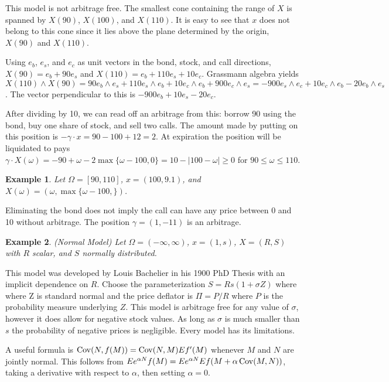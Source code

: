 \documentclass[fleqn]{amsart}
\newcommand{\Cov}{\mathop{\rm{Cov}}}
\newtheorem{example}{Example}
\begin{document}
This model is not arbitrage free.  The smallest cone containing the
range of $X$ is spanned by $X(90)$, $X(100)$, and $X(110)$. It is easy
to see that $x$ does not belong to this cone since it lies above the
plane determined by the origin, $X(90)$ and $X(110)$.

Using $e_b$, $e_s$, and $e_c$ as unit vectors in the bond, stock, and call
directions, $X(90) = e_b + 90e_s$ and $X(110) = e_b + 110e_s + 10e_c$.
Grassmann algebra\cite{Pea1999} yields $X(110)\wedge X(90)
= 90 e_b\wedge e_s + 110e_s\wedge e_b + 10e_c\wedge e_b + 900e_c\wedge e_s
= -900e_s\wedge e_c + 10e_c\wedge e_b - 20e_b\wedge e_s$. The vector
perpendicular to this is $-900e_b + 10e_s - 20e_c$.

After dividing by 10, we can read off an arbitrage from this: borrow 90
using the bond, buy one share of stock, and sell two calls. The amount
made by putting on this position is $-\gamma\cdot x = 90 - 100 + 12 = 2$. At
expiration the position will be liquidated to pays $\gamma\cdot X(\omega)
= -90 + \omega - 2\max\{\omega - 100, 0\} = 10 - |100 - \omega| \ge 0$
for $90\le\omega\le 110$.

\begin{example}
Let $\Omega = [90,110]$, $x = (100, 9.1)$, 
and $X(\omega) = (\omega, \max\{\omega - 100, \})$.
\end{example}

Eliminating the bond does not imply the call can have any price
between 0 and 10 without arbitrage. The position
$\gamma = (1, -11)$ is an arbitrage.

\begin{example}{(Normal Model)}
Let \(\Omega = (-\infty,\infty)\), \(x = (1, s)\), 
\(X = (R, S)\) with \(R\) scalar, and \(S\) normally distributed.
\end{example}
This model was developed by Louis Bachelier in his
1900 PhD Thesis\cite{Bac1900} with an implicit dependence on \(R\). 
Choose the parameterization \(S = Rs(1 + \sigma Z)\) where
where Z is standard normal and the price deflator is \(\Pi = P/R\)
where \(P\) is the probability measure underlying
\(Z\). This model is arbitrage free for any value of \(\sigma\),
however it does allow for negative stock values. As long as
\(\sigma\) is much smaller than \(s\) the probability of
negative prices is negligible. Every model has its limitations.

A useful formula is \(\Cov(N, f(M)) = \Cov(N,M)Ef'(M)\) whenever
\(M\) and \(N\) are jointly normal.  This follows from \(Ee^{\alpha N}
f(M) = Ee^{\alpha N} E f(M + \alpha\Cov(M,N))\), taking a derivative
with respect to \(\alpha\), then setting \(\alpha = 0\).
\end{document}
